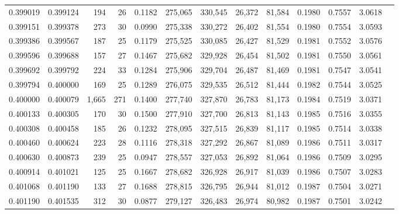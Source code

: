 \begin{tabular}{rrrrrrrrrrrrr}
0.399019 & 0.399124 &    194 &    26 &                                     0.1182 & 275,065 & 330,545 &  26,372 &  81,584 & 0.1980 & 0.7557 & 3.0618 \\
0.399151 & 0.399378 &    273 &    30 &                                     0.0990 & 275,338 & 330,272 &  26,402 &  81,554 & 0.1980 & 0.7554 & 3.0593 \\
0.399386 & 0.399567 &    187 &    25 &                                     0.1179 & 275,525 & 330,085 &  26,427 &  81,529 & 0.1981 & 0.7552 & 3.0576 \\
0.399596 & 0.399688 &    157 &    27 &                                     0.1467 & 275,682 & 329,928 &  26,454 &  81,502 & 0.1981 & 0.7550 & 3.0561 \\
0.399692 & 0.399792 &    224 &    33 &                                     0.1284 & 275,906 & 329,704 &  26,487 &  81,469 & 0.1981 & 0.7547 & 3.0541 \\
0.399794 & 0.400000 &    169 &    25 &                                     0.1289 & 276,075 & 329,535 &  26,512 &  81,444 & 0.1982 & 0.7544 & 3.0525 \\
0.400000 & 0.400079 &  1,665 &   271 &                                     0.1400 & 277,740 & 327,870 &  26,783 &  81,173 & 0.1984 & 0.7519 & 3.0371 \\
0.400133 & 0.400305 &    170 &    30 &                                     0.1500 & 277,910 & 327,700 &  26,813 &  81,143 & 0.1985 & 0.7516 & 3.0355 \\
0.400308 & 0.400458 &    185 &    26 &                                     0.1232 & 278,095 & 327,515 &  26,839 &  81,117 & 0.1985 & 0.7514 & 3.0338 \\
0.400460 & 0.400624 &    223 &    28 &                                     0.1116 & 278,318 & 327,292 &  26,867 &  81,089 & 0.1986 & 0.7511 & 3.0317 \\
0.400630 & 0.400873 &    239 &    25 &                                     0.0947 & 278,557 & 327,053 &  26,892 &  81,064 & 0.1986 & 0.7509 & 3.0295 \\
0.400914 & 0.401021 &    125 &    25 &                                     0.1667 & 278,682 & 326,928 &  26,917 &  81,039 & 0.1986 & 0.7507 & 3.0283 \\
0.401068 & 0.401190 &    133 &    27 &                                     0.1688 & 278,815 & 326,795 &  26,944 &  81,012 & 0.1987 & 0.7504 & 3.0271 \\
0.401190 & 0.401535 &    312 &    30 &                                     0.0877 & 279,127 & 326,483 &  26,974 &  80,982 & 0.1987 & 0.7501 & 3.0242 \\

\end{tabular}
